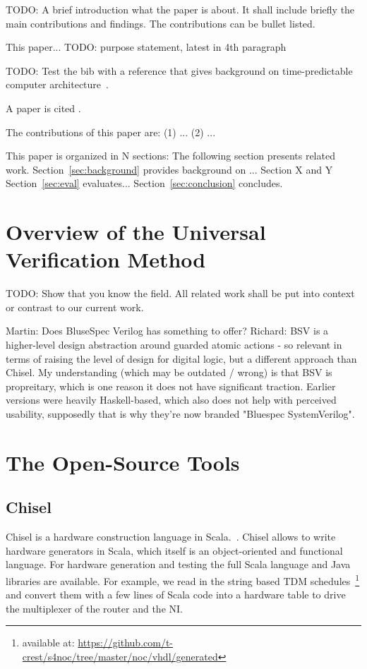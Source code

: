 \documentclass[a4paper, conference]{IEEEtran}
\newcommand{\todo}[1]{{\color{olive} TODO: #1}}
\newcommand{\martin}[1]{{\color{blue} Martin: #1}}
\newcommand{\ducky}[1]{{\color{orange} Richard: #1}}
\begin{document}
\todo{A brief introduction what the paper is about. It shall include briefly the
main contributions and findings. The contributions can be bullet listed.}

This paper... \todo{purpose statement, latest in 4th paragraph}

\todo{Test the bib with a reference that gives background on time-predictable
computer architecture~\cite{tpca:jes}.}

A paper is cited \cite{paper:example}.

The contributions of this paper are: (1) ... (2) ...

This paper is organized in N sections: The following section presents related work.
Section~\ref{sec:background} provides background on ...
Section X and Y 
Section~\ref{sec:eval} evaluates...
Section~\ref{sec:conclusion} concludes.


\section{Overview of the Universal Verification Method}
\label{sec:related}

\todo{Show that you know the field. All related work shall be put
into context or contrast to our current work.}

\martin{Does BluseSpec Verilog has something to offer?}
\ducky{BSV is a higher-level design abstraction around guarded atomic actions - so relevant in terms of raising the level of design for digital logic, but a different approach than Chisel. My understanding (which may be outdated / wrong) is that BSV is propreitary, which is one reason it does not have significant traction. Earlier versions were heavily Haskell-based, which also does not help with perceived usability, supposedly that is why they're now branded "Bluespec SystemVerilog".}

\section{The Open-Source Tools}

\subsection{Chisel}

Chisel is a hardware construction language in Scala.~\cite{chisel:dac2012}.
Chisel allows to write hardware generators
in Scala, which itself is an object-oriented and functional language.
For hardware generation and testing the full Scala language and Java
libraries are available. For example, we read in the string based TDM
schedules~\footnote{available at: \url{https://github.com/t-crest/s4noc/tree/master/noc/vhdl/generated}}
and convert them with a few lines of Scala code into a hardware table to
drive the multiplexer of the router and the NI.
\end{document}

